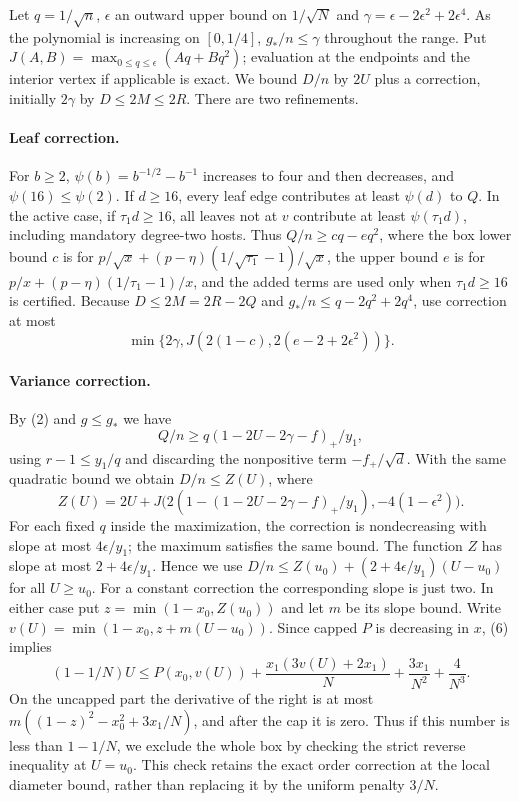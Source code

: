 Let $q=1/\sqrt n$, $\epsilon$ an outward upper bound on $1/\sqrt N$ and $\gamma=\epsilon-2\epsilon^2+2\epsilon^4$. As the polynomial is increasing on $[0,1/4]$, $g_*/n\le\gamma$ throughout the range. Put $J(A,B)=\max_{0\le q\le\epsilon}(Aq+Bq^2)$; evaluation at the endpoints and the interior vertex if applicable is exact. We bound $D/n$ by $2U$ plus a correction, initially $2\gamma$ by $D\le2M\le2R$. There are two refinements.

\paragraph{Leaf correction.}
For $b\ge2$, $\psi(b)=b^{-1/2}-b^{-1}$ increases to four and then decreases, and $\psi(16)\le\psi(2)$. If $d\ge16$, every leaf edge contributes at least $\psi(d)$ to $Q$. In the active case, if $\tau_1d\ge16$, all leaves not at $v$ contribute at least $\psi(\tau_1d)$, including mandatory degree-two hosts. Thus $Q/n\ge cq-eq^2$, where the box lower bound $c$ is for $p/\sqrt{x}+(p-\eta)(1/\sqrt{\tau_1}-1)/\sqrt{x}$, the upper bound $e$ is for $p/x+(p-\eta)(1/\tau_1-1)/x$, and the added terms are used only when $\tau_1d\ge16$ is certified. Because $D\le2M=2R-2Q$ and $g_*/n\le q-2q^2+2q^4$, use correction at most
\[
 \min\{2\gamma,J(2(1-c),2(e-2+2\epsilon^2))\}.
\]

\paragraph{Variance correction.}
By (2) and $g\le g_*$ we have
\[
 Q/n\ge q(1-2U-2\gamma-f)_+/y_1,
\]
using $r-1\le y_1/q$ and discarding the nonpositive term $-f_+/\sqrt d$. With the same quadratic bound we obtain $D/n\le Z(U)$, where
\[
 Z(U)=2U+J\bigl(2(1-(1-2U-2\gamma-f)_+/y_1),-4(1-\epsilon^2)\bigr).
\]
For each fixed $q$ inside the maximization, the correction is nondecreasing with slope at most $4\epsilon/y_1$; the maximum satisfies the same bound.
The function $Z$ has slope at most $2+4\epsilon/y_1$. Hence we use $D/n\le Z(u_0)+(2+4\epsilon/y_1)(U-u_0)$ for all $U\ge u_0$. For a constant correction the corresponding slope is just two. In either case put $z=\min(1-x_0,Z(u_0))$ and let $m$ be its slope bound. Write $v(U)=\min(1-x_0,z+m(U-u_0))$. Since capped $P$ is decreasing in $x$, (6) implies
\[
 (1-1/N)U\le P(x_0,v(U))+\frac{x_1(3v(U)+2x_1)}N+\frac{3x_1}{N^2}+\frac4{N^3}.
\]
On the uncapped part the derivative of the right is at most $m((1-z)^2-x_0^2+3x_1/N)$, and after the cap it is zero. Thus if this number is less than $1-1/N$, we exclude the whole box by checking the strict reverse inequality at $U=u_0$. This check retains the exact order correction at the local diameter bound, rather than replacing it by the uniform penalty $3/N$.

